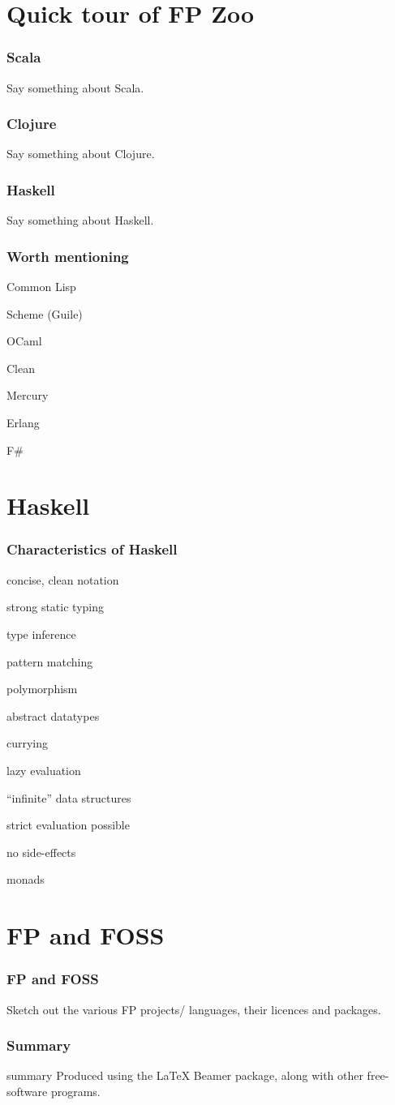 \section{Quick tour of FP Zoo}

\begin{frame}
\frametitle{Scala}
Say something about Scala.
\end{frame}

\begin{frame}
\frametitle{Clojure}
Say something about Clojure.
\end{frame}

\begin{frame}
\frametitle{Haskell}
Say something about Haskell.
\end{frame}

\begin{frame}
\frametitle{Worth mentioning}
\bi
\item Common Lisp
\item Scheme (Guile)
\item OCaml
\item Clean
\item Mercury
\item Erlang
\item F\#
\ei
\end{frame}

\section{Haskell}

\begin{frame}
\frametitle{Characteristics of Haskell}
\bi
\item concise, clean notation
\item strong static typing
\bi
\item type inference
\ei
\item pattern matching
\item polymorphism
\item abstract datatypes
\item currying
\item lazy evaluation
\bi
\item ``infinite'' data structures
\item strict evaluation possible
\ei
\item no side-effects
\item monads
\ei
\end{frame}

\section{FP and FOSS}

\begin{frame}
\frametitle{FP and FOSS}
Sketch out the various FP projects{\slash} languages, their
licences and packages.
\end{frame}

\begin{frame}
\frametitle{Summary}
\bi
\item summary
\ei
\medskip
{\scriptsize Produced using the {\LaTeX} Beamer package, along
  with other free-software programs.}
\end{frame}



